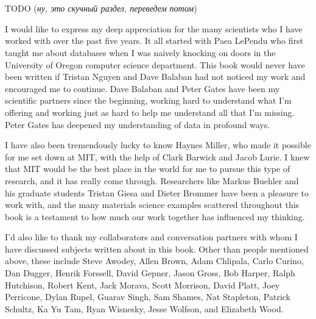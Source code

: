 \documentclass[../main/CT4S-EN-RU]{subfiles}
\begin{document}
\section{}

\begin{blockRUS}
TODO ({\em ну, это скучный раздел, переведем потом}) 
\end{blockRUS}

\begin{blockENG}
I would like to express my deep appreciation for the many scientists who I have worked with over the past five years. It all started with Paea LePendu who first taught me about databases when I was naively knocking on doors in the University of Oregon computer science department. This book would never have been written if Tristan Nguyen and Dave Balaban had not noticed my work and encouraged me to continue. Dave Balaban and Peter Gates have been my scientific partners since the beginning, working hard to understand what I'm offering and working just as hard to help me understand all that I'm missing. Peter Gates has deepened my understanding of data in profound ways.
\end{blockENG}

\begin{blockRUS}
\end{blockRUS} 

\begin{blockENG}
I have also been tremendously lucky to know Haynes Miller, who made it possible for me set down at MIT, with the help of Clark Barwick and Jacob Lurie. I knew that MIT would be the best place in the world for me to pursue this type of research, and it has really come through. Researchers like Markus Buehler and his graduate students Tristan Giesa and Dieter Brommer have been a pleasure to work with, and the many materials science examples scattered throughout this book is a testament to how much our work together has influenced my thinking.
\end{blockENG}

\begin{blockRUS}
\end{blockRUS}

\begin{blockENG}
I'd also like to thank my collaborators and conversation partners with whom I have discussed subjects written about in this book. Other than people mentioned above, these include Steve Awodey, Allen Brown, Adam Chlipala, Carlo Curino, Dan Dugger, Henrik Forssell, David Gepner, Jason Gross, Bob Harper, Ralph Hutchison, Robert Kent, Jack Morava, Scott Morrison, David Platt, Joey Perricone, Dylan Rupel, Guarav Singh, Sam Shames, Nat Stapleton, Patrick Schultz, Ka Yu Tam, Ryan Wisnesky, Jesse Wolfson, and Elizabeth Wood.
\end{blockENG}
\end{document}
